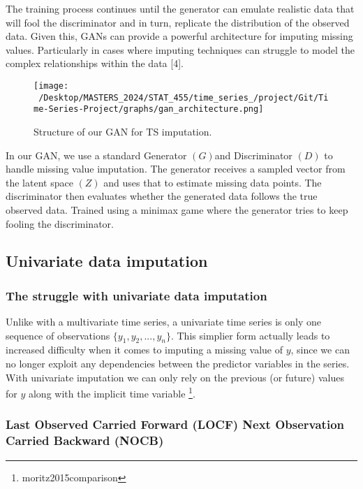 \documentclass[
]{report}
\begin{document}
The training process continues until the generator can emulate realistic
data that will fool the discriminator and in turn, replicate the
distribution of the observed data. Given this, GANs can provide a
powerful architecture for imputing missing values. Particularly in cases
where imputing techniques can struggle to model the complex
relationships within the data {[}4{]}.

\begin{figure}
\centering
\texttt{[image: ~/Desktop/MASTERS\_2024/STAT\_455/time\_series\_/project/Git/Time-Series-Project/graphs/gan\_architecture.png]}
\caption{Structure of our GAN for TS imputation.}
\end{figure}

In our GAN, we use a standard Generator \((G)\)and Discriminator \((D)\)
to handle missing value imputation. The generator receives a sampled
vector from the latent space \((Z)\) and uses that to estimate missing
data points. The discriminator then evaluates whether the generated data
follows the true observed data. Trained using a minimax game where the
generator tries to keep fooling the discriminator.

\hypertarget{univariate-data-imputation}{%
\subsection{Univariate data
imputation}\label{univariate-data-imputation}}

\hypertarget{the-struggle-with-univariate-data-imputation}{%
\subsubsection{The struggle with univariate data
imputation}\label{the-struggle-with-univariate-data-imputation}}

Unlike with a multivariate time series, a univariate time series is only
one sequence of observations \(\{y_1, y_2, ..., y_n\}\). This simplier
form actually leads to increased difficulty when it comes to imputing a
missing value of \(y\), since we can no longer exploit any dependencies
between the predictor variables in the series. With univariate
imputation we can only rely on the previous (or future) values for \(y\)
along with the implicit time variable \footnote{moritz2015comparison}.

\hypertarget{last-observed-carried-forward-locf-next-observation-carried-backward-nocb}{%
\subsubsection{Last Observed Carried Forward (LOCF) Next Observation
Carried Backward
(NOCB)}\label{last-observed-carried-forward-locf-next-observation-carried-backward-nocb}}
\end{document}
